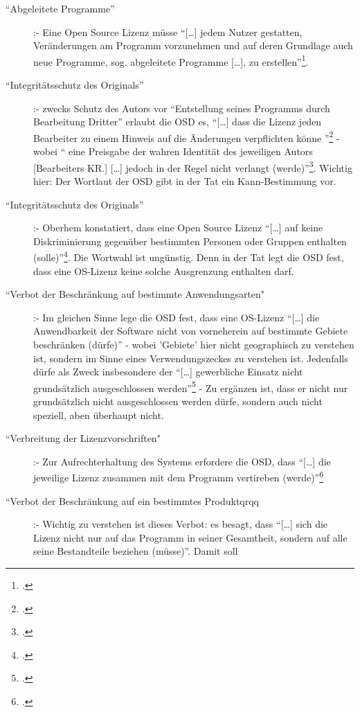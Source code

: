 \documentclass[DIV=calc,BCOR=5mm,11pt,headings=small,oneside,abstract=true, toc=bib]{scrartcl}
\begin{document}
\begin{description}
  \item[``Abgeleitete Programme''] :- Eine Open Source Lizenz müsse
  \enquote{[\ldots] jedem Nutzer gestatten, Veränderungen am Programm
  vorzunehmen und auf deren Grundlage auch neue Programme, sog.
  abgeleitete Programme [\ldots], zu
  erstellen}\footcite[vgl.][14]{Oberhem2008a}.
  \item[``Integritätsschutz des Originals''] :- zwecks Schutz des
  Autors vor \enquote{Entstellung seines Programms durch Bearbeitung
  Dritter} erlaubt die OSD es, \enquote{[\ldots] dass die Lizenz
  jeden Bearbeiter zu einem Hinweis auf die Änderungen verpflichten könne
  }\footcite[vgl.][14]{Oberhem2008a} - wobei \enquote{ eine Preisgabe
  der wahren Identität des jeweiligen Autors [Bearbeiters KR.] [\ldots]
  jedoch in der Regel nicht verlangt
  (werde)}\footcite[vgl.][15]{Oberhem2008a}. Wichtig hier: Der Wortlaut
  der OSD gibt in der Tat ein Kann-Bestimmung vor.
  \item[``Integritätsschutz des Originals''] :- Oberhem konstatiert,
  dass eine Open Source Lizenz \enquote{[\ldots] auf keine Diskriminierung
  gegenüber bestimmten Personen oder Gruppen enthalten
  (solle)}\footcite[vgl.][15]{Oberhem2008a}. Die Wortwahl ist ungünstig.
  Denn in der Tat legt die OSD fest, dass eine OS-Lizenz keine solche
  Ausgrenzung enthalten darf.
  \item[``Verbot der Beschränkung auf bestimmte Anwendungsarten"] :-
  Im gleichen Sinne lege die OSD fest, dass eine OS-Lizenz \enquote{[\ldots]
  die Anwendbarkeit der Software nicht von vorneherein auf bestimmte
  Gebiete beschränken (dürfe)} - wobei 'Gebiete' hier nicht geographisch
  zu verstehen ist, sondern im Sinne eines Verwendungszeckes zu verstehen ist.
  Jedenfalls dürfe als Zweck insbesondere der \enquote{[\ldots]
  gewerbliche Einsatz nicht grundsätzlich ausgeschlossen
  werden}\footcite[vgl.][15]{Oberhem2008a} - Zu ergänzen ist, dass er
  nicht nur grundsätzlich nicht ausgeschlossen werden dürfe, sondern auch nicht
  speziell, aben überhaupt nicht.
  \item[``Verbreitung der Lizenzvorschriften"] :- Zur
  Aufrechterhaltung des Systems erfordere die OSD, dass \enquote{[\ldots]
  die jeweilige Lizenz zusammen mit dem Programm vertireben
  (werde)}\footcite[vgl.][16]{Oberhem2008a}
  \item[``Verbot der Beschränkung auf ein bestimmtes Produktqrqq{}] :-
  Wichtig zu verstehen ist dieses Verbot: es besagt, dass \enquote{[\ldots]
  sich die Lizenz nicht nur auf das Programm in seiner Gesamtheit,
  sondern auf alle seine Bestandteile beziehen (müsse)}. Damit soll

\end{description}
\end{document}
